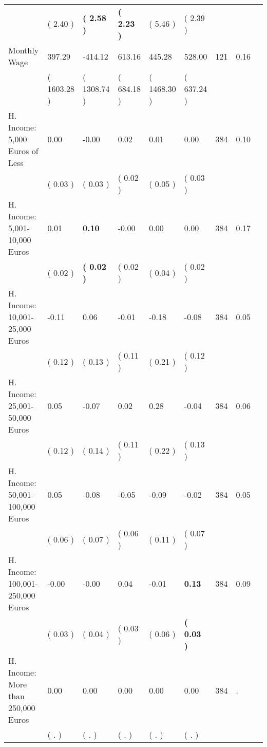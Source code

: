 \begin{tabular}{L{6.2cm} C{1.8cm} C{1.8cm} C{1.8cm} C{1.8cm} C{1.8cm} C{1.8cm} C{0.3cm} C{0.3cm}}
 & (     2.40 ) & \textbf{(     2.58 )} & \textbf{(     2.23 )} & (     5.46 ) & (     2.39 )  & \\
Monthly Wage &    397.29 &   -414.12 &    613.16 &    445.28 &    528.00  & 121 &       0.16 \\ 
 & (  1603.28 ) & (  1308.74 ) & (   684.18 ) & (  1468.30 ) & (   637.24 )  & \\
H. Income: 5,000 Euros of Less &      0.00 &     -0.00 &      0.02 &      0.01 &      0.00  & 384 &       0.10 \\ 
 & (     0.03 ) & (     0.03 ) & (     0.02 ) & (     0.05 ) & (     0.03 )  & \\
H. Income: 5,001-10,000 Euros &      0.01 & \textbf{     0.10} &     -0.00 &      0.00 &      0.00  & 384 &       0.17 \\ 
 & (     0.02 ) & \textbf{(     0.02 )} & (     0.02 ) & (     0.04 ) & (     0.02 )  & \\
H. Income: 10,001-25,000 Euros &     -0.11 &      0.06 &     -0.01 &     -0.18 &     -0.08  & 384 &       0.05 \\ 
 & (     0.12 ) & (     0.13 ) & (     0.11 ) & (     0.21 ) & (     0.12 )  & \\
H. Income: 25,001-50,000 Euros &      0.05 &     -0.07 &      0.02 &      0.28 &     -0.04  & 384 &       0.06 \\ 
 & (     0.12 ) & (     0.14 ) & (     0.11 ) & (     0.22 ) & (     0.13 )  & \\
H. Income: 50,001-100,000 Euros &      0.05 &     -0.08 &     -0.05 &     -0.09 &     -0.02  & 384 &       0.05 \\ 
 & (     0.06 ) & (     0.07 ) & (     0.06 ) & (     0.11 ) & (     0.07 )  & \\
H. Income: 100,001-250,000 Euros &     -0.00 &     -0.00 &      0.04 &     -0.01 & \textbf{     0.13}  & 384 &       0.09 \\ 
 & (     0.03 ) & (     0.04 ) & (     0.03 ) & (     0.06 ) & \textbf{(     0.03 )}  & \\
H. Income: More than 250,000 Euros &      0.00 &      0.00 &      0.00 &      0.00 &      0.00  & 384 &          . \\ 
 & (        . ) & (        . ) & (        . ) & (        . ) & (        . )  & \\
\bottomrule
\end{tabular}
